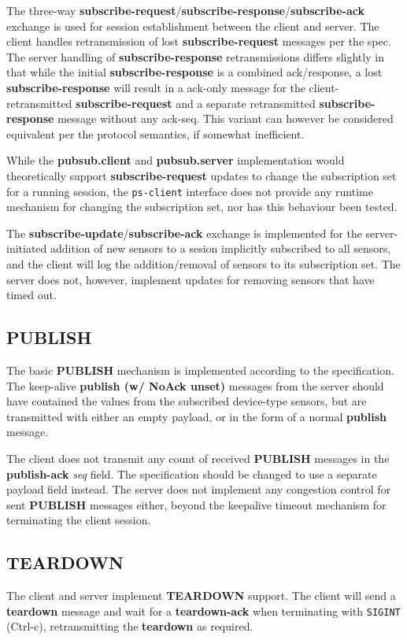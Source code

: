 \documentclass[a4paper]{article}
\begin{document}
The three-way \textbf{subscribe-request}/\textbf{subscribe-response}/\textbf{subscribe-ack} exchange is used for session establishment between the client and server.
The client handles retransmission of lost \textbf{subscribe-request} messages per the spec.
The server handling of \textbf{subscribe-response} retransmissions differs slightly in that while the initial \textbf{subscribe-response} is a combined ack/response, a lost \textbf{subscribe-response} will result in a ack-only message for the client-retransmitted \textbf{subscribe-request} and a separate retransmitted \textbf{subscribe-response} message without any ack-seq.
This variant can however be considered equivalent per the protocol semantics, if somewhat inefficient.

While the \textbf{pubsub.client} and \textbf{pubsub.server} implementation would theoretically support \textbf{subscribe-request} updates to change the subscription set for a running session, the \texttt{ps-client} interface does not provide any runtime mechanism for changing the subscription set, nor has this behaviour been tested.

The \textbf{subscribe-update}/\textbf{subscribe-ack} exchange is implemented for the server-initiated addition of new sensors to a sesion implicitly subscribed to all sensors, and the client will log the addition/removal of sensors to its subscription set.
The server does not, however, implement updates for removing sensors that have timed out.

\subsection{\textbf{PUBLISH}}
The basic \textbf{PUBLISH} mechanism is implemented according to the specification.
The keep-alive \textbf{publish (w/ NoAck unset)} messages from the server should have contained the values from the subscribed device-type sensors, but are transmitted with either an empty payload, or in the form of a normal \textbf{publish} message.

The client does not transmit any count of received \textbf{PUBLISH} messages in the \textbf{publish-ack} \textit{seq} field.
The specification should be changed to use a separate payload field instead.
The server does not implement any congestion control for sent \textbf{PUBLISH} messages either, beyond the keepalive timeout mechanism for terminating the client session.

\subsection{\textbf{TEARDOWN}}
The client and server implement \textbf{TEARDOWN} support.
The client will send a \textbf{teardown} message and wait for a \textbf{teardown-ack} when terminating with \texttt{SIGINT} (Ctrl-c), retransmitting the \textbf{teardown} as required.
\end{document}
